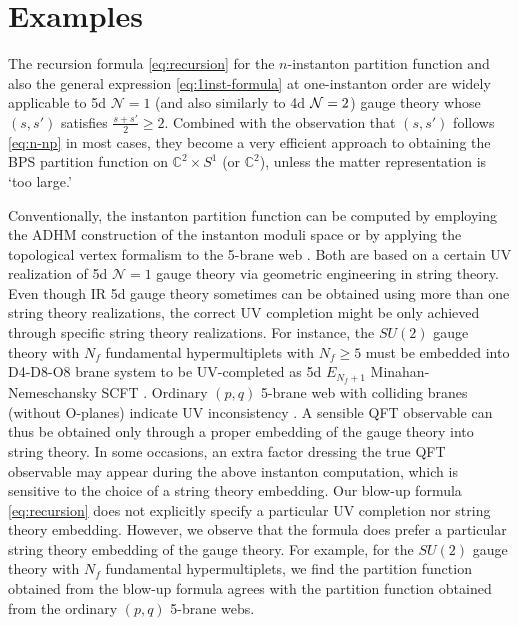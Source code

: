 \documentclass[letterpaper, 11pt]{article}
\def\IC{\mathbb{C}}
\def\CN{{\cal N}}
\begin{document}
{%

\section{Examples} \label{sec:example}

The recursion formula \eqref{eq:recursion} for the $n$-instanton partition function and also the general expression \eqref{eq:1inst-formula} at one-instanton order are widely applicable to 5d $\mathcal{N}=1$ (and also similarly to 4d $\CN=2$) gauge theory whose $(s,s')$ satisfies $\frac{s+s'}{2}\geq 2$. Combined with the observation that $(s,s')$ follows \eqref{eq:n-np} in most cases, they become a very efficient approach to obtaining the BPS partition function on $\IC^2 \times S^1$ (or $\IC^2$), unless the matter representation is `too large.' 

Conventionally, the instanton partition function can be computed by employing the ADHM construction of the instanton moduli space \cite{Atiyah:1978ri,Nekrasov:2002qd,Nekrasov:2003rj} or by applying the topological vertex formalism to the 5-brane web \cite{Aganagic:2003db,Iqbal:2007ii}. Both are based on a certain UV realization of 5d $\mathcal{N}=1$ gauge theory via geometric engineering in string theory. 
Even though IR 5d gauge theory sometimes can be obtained using more than one string theory realizations, the correct UV completion might be only achieved through specific string theory realizations. For instance, the $SU(2)$ gauge theory with $N_f$ fundamental hypermultiplets with $N_f\geq 5$ must be embedded into D4-D8-O8 brane system to be UV-completed as 5d $E_{N_f+1}$ Minahan-Nemeschansky SCFT \cite{Seiberg:1996bd, Minahan:1996fg, Minahan:1996cj}. Ordinary $(p,q)$ 5-brane web with colliding branes (without O-planes) indicate UV inconsistency \cite{Aharony:1997ju}. 
A sensible QFT observable can thus be obtained only through a proper embedding of the gauge theory into string theory. In some occasions, an extra factor dressing the true QFT observable may appear during the above instanton computation, which is sensitive to the choice of a string theory embedding.
Our blow-up formula \eqref{eq:recursion} does not explicitly specify a particular UV completion nor string theory embedding. However, we observe that the formula does prefer a particular string theory embedding of the gauge theory. For example, for the $SU(2)$ gauge theory with $N_f$ fundamental hypermultiplets, we find the partition function obtained from the blow-up formula agrees with the partition function obtained from the ordinary $(p,q)$ 5-brane webs. 

}
\end{document}
